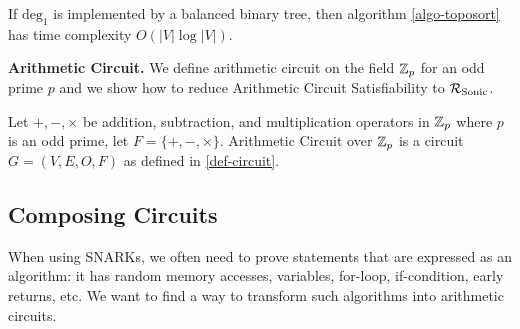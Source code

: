 
If $\mathrm{deg_1}$ is implemented by a balanced binary tree, then algorithm \ref{algo-toposort} has time complexity $O(|V| \log |V|)$.

\textbf{Arithmetic Circuit.} We define arithmetic circuit on the field $\mathbb{Z}_p$ for an odd prime $p$ and we show how to reduce Arithmetic Circuit Satisfiability to $\mathcal{R}_{\mathrm{Sonic}}$.

\begin{definition}
\label{def-arithmetic-circuit}
Let $+, -, \times$ be addition, subtraction, and multiplication operators in $\mathbb{Z}_p$ where $p$ is an odd prime, let $F = \{ +, -, \times \}$. Arithmetic Circuit over $\mathbb{Z}_p$ is a circuit $G = (V, E, O, F)$ as defined in \ref{def-circuit}.
\end{definition}


\subsection{Composing Circuits}

When using SNARKs, we often need to prove statements that are expressed as an algorithm: it has random memory accesses, variables, for-loop, if-condition, early returns, etc. We want to find a way to transform such algorithms into arithmetic circuits.

